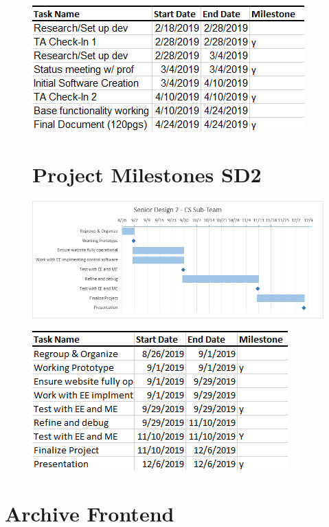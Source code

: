 \documentclass[12pt]{report}
\begin{document}
\begin{figure}
	\centering
	\includegraphics{SD1Dates}
\end{figure}

\clearpage

\begin{figure}
	\section*{Project Milestones SD2}
	\includegraphics[width=\linewidth]{SD2Gantt}
\end{figure}

\begin{figure}
	\centering
	\includegraphics{SD2Dates}
\end{figure}

\clearpage

\section*{Archive Frontend}
\end{document}
